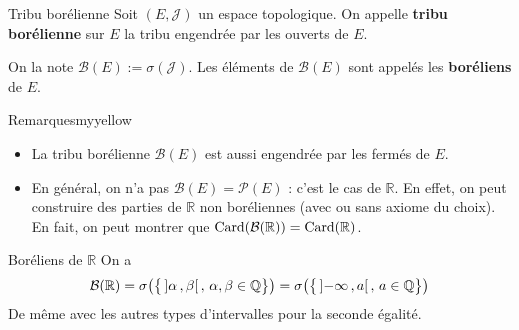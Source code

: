     \begin{defi}{Tribu borélienne}{}
        Soit $(E,\mathcal{J})$ un espace topologique. On appelle \textbf{tribu borélienne} sur $E$ la tribu engendrée par les ouverts de $E$. 

        On la note $\mathcal{B}(E) := \sigma(\mathcal{J})$. Les éléments de $\mathcal{B}(E)$ sont appelés les \textbf{boréliens} de $E$.
    \end{defi}

    \begin{omed}{Remarques}{myyellow}
        \begin{itemize}
            \item La tribu borélienne $\mathcal{B}(E)$ est aussi engendrée par les fermés de $E$.
            \item En général, on n’a pas $\mathcal{B}(E) = \mathcal{P}(E)$ : c’est le cas de $\mathbb{R}$. En effet, on peut construire des parties de $\mathbb{R}$ non boréliennes (avec ou sans axiome du choix). En fait, on peut montrer que $\operatorname{Card}(\mathcal{B}(\mathbb{R})) = \operatorname{Card}(\mathbb{R})$.
        \end{itemize}
    \end{omed}

    \begin{prop}{Boréliens de $\mathbb{R}$}{}
        On a 
        \[ \mathcal{B}(\mathbb{R}) = \sigma\big(\big\{ \left] \alpha \, , \beta \right[, \, \alpha, \beta \in \mathbb{Q} \big\}\big) = \sigma\big(\big\{ \left] -\infty \, , a \right[, \, a \in \mathbb{Q} \big\}\big) \]   
        De même avec les autres types d’intervalles pour la seconde égalité.
    \end{prop}

